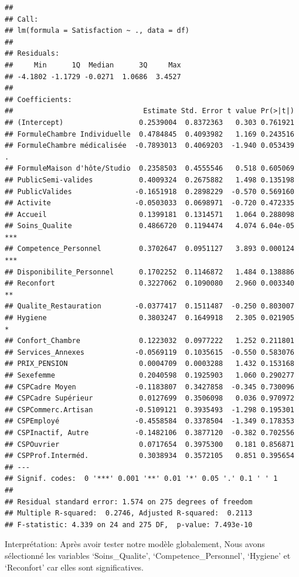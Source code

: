 \documentclass[
]{article}
\begin{document}
\begin{verbatim}
## 
## Call:
## lm(formula = Satisfaction ~ ., data = df)
## 
## Residuals:
##     Min      1Q  Median      3Q     Max 
## -4.1802 -1.1729 -0.0271  1.0686  3.4527 
## 
## Coefficients:
##                               Estimate Std. Error t value Pr(>|t|)    
## (Intercept)                  0.2539004  0.8372363   0.303 0.761921    
## FormuleChambre Individuelle  0.4784845  0.4093982   1.169 0.243516    
## FormuleChambre médicalisée  -0.7893013  0.4069203  -1.940 0.053439 .  
## FormuleMaison d'hôte/Studio  0.2358503  0.4555546   0.518 0.605069    
## PublicSemi-valides           0.4009324  0.2675882   1.498 0.135198    
## PublicValides               -0.1651918  0.2898229  -0.570 0.569160    
## Activite                    -0.0503033  0.0698971  -0.720 0.472335    
## Accueil                      0.1399181  0.1314571   1.064 0.288098    
## Soins_Qualite                0.4866720  0.1194474   4.074 6.04e-05 ***
## Competence_Personnel         0.3702647  0.0951127   3.893 0.000124 ***
## Disponibilite_Personnel      0.1702252  0.1146872   1.484 0.138886    
## Reconfort                    0.3227062  0.1090080   2.960 0.003340 ** 
## Qualite_Restauration        -0.0377417  0.1511487  -0.250 0.803007    
## Hygiene                      0.3803247  0.1649918   2.305 0.021905 *  
## Confort_Chambre              0.1223032  0.0977222   1.252 0.211801    
## Services_Annexes            -0.0569119  0.1035615  -0.550 0.583076    
## PRIX_PENSION                 0.0004709  0.0003288   1.432 0.153168    
## Sexefemme                    0.2040598  0.1925903   1.060 0.290277    
## CSPCadre Moyen              -0.1183807  0.3427858  -0.345 0.730096    
## CSPCadre Supérieur           0.0127699  0.3506098   0.036 0.970972    
## CSPCommerc.Artisan          -0.5109121  0.3935493  -1.298 0.195301    
## CSPEmployé                  -0.4558584  0.3378504  -1.349 0.178353    
## CSPInactif, Autre           -0.1482106  0.3877120  -0.382 0.702556    
## CSPOuvrier                   0.0717654  0.3975300   0.181 0.856871    
## CSPProf.Interméd.            0.3038934  0.3572105   0.851 0.395654    
## ---
## Signif. codes:  0 '***' 0.001 '**' 0.01 '*' 0.05 '.' 0.1 ' ' 1
## 
## Residual standard error: 1.574 on 275 degrees of freedom
## Multiple R-squared:  0.2746, Adjusted R-squared:  0.2113 
## F-statistic: 4.339 on 24 and 275 DF,  p-value: 7.493e-10
\end{verbatim}

Interprétation: Après avoir tester notre modèle globalement, Nous avons
sélectionné les variables `Soins\_Qualite', `Competence\_Personnel',
`Hygiene' et `Reconfort' car elles sont significatives.
\end{document}
